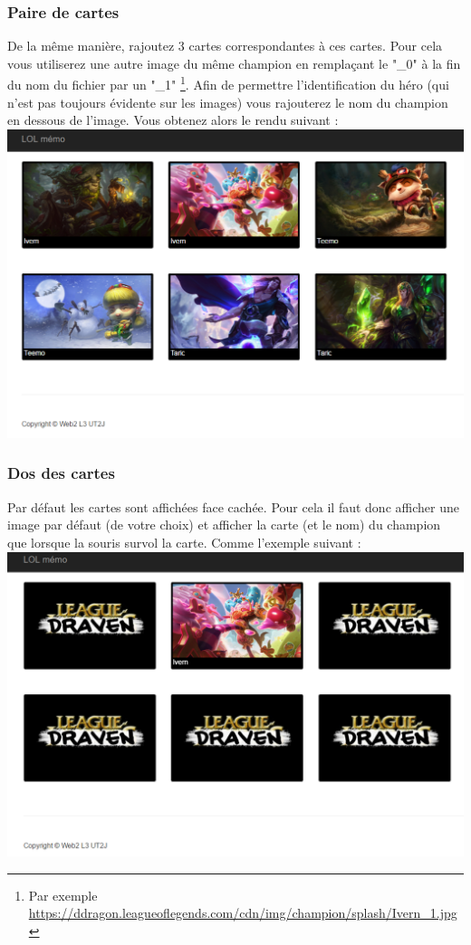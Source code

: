\documentclass[a4paper,11pt]{article}
\theoremstyle{mytheor}
\begin{document}
\subsubsection{Paire de cartes}
De la même manière, rajoutez 3 cartes correspondantes à ces cartes. Pour cela vous utiliserez une autre image du même champion en remplaçant le "\_0" à la fin du nom du fichier par un "\_1" \footnote{Par exemple \url{https://ddragon.leagueoflegends.com/cdn/img/champion/splash/Ivern_1.jpg}}. Afin de permettre l'identification du héro (qui n'est pas toujours évidente sur les images) vous rajouterez le nom du champion en dessous de l'image. Vous obtenez alors le rendu suivant : \\
\includegraphics[width=\textwidth]{img/plateau2.png}

\subsubsection{Dos des cartes}
Par défaut les cartes sont affichées face cachée. Pour cela il faut donc afficher une image par défaut (de votre choix) et afficher la carte (et le nom) du champion que lorsque la souris survol la carte. Comme l'exemple suivant : \\
\includegraphics[width=\textwidth]{img/plateau3.png}
\end{document}
